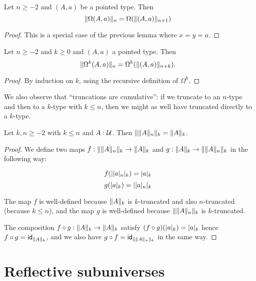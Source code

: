 \begin{cor}
  Let $n\ge-2$ and $(A,a)$ be a pointed type. Then
  \[\trunc n{\Omega(A,a)}=\Omega(\trunc{n+1}{(A,a)})\]
\end{cor}
\begin{proof}
  This is a special case of the previous lemma where $x=y=a$.
\end{proof}

\begin{cor}
  Let $n\ge -2$ and $k\ge 0$ and $(A,a)$ a pointed type.  Then
  \[\trunc n{\Omega^k(A,a)} = \Omega^k(\trunc{n+k}{(A,a)}). \]
\end{cor}
\begin{proof}
  By induction on $k$, using the recursive definition of $\Omega^k$.
\end{proof}

We also observe that ``truncations are cumulative'': if we truncate to an $n$-type and then to a $k$-type with $k\le n$, then we might as
well have truncated directly to a $k$-type.

\begin{lem}
  Let $k,n\ge-2$ with $k\le{}n$ and $A:\type$. Then
  $\trunc k{\trunc nA}=\trunc kA$.
\end{lem}
\begin{proof}
  We define two maps $f:\trunc k{\trunc nA}\to\trunc kA$ and
  $g:\trunc kA\to\trunc k{\trunc nA}$ in the following way:

  \[f(\tproj k{\tproj na})=\tproj ka\]
  \[g(\tproj ka)=\tproj k{\tproj na}\]

  The map $f$ is well-defined because $\trunc kA$ is $k$-truncated and also
  $n$-truncated (because $k\le{}n$), and the map $g$ is well-defined because
  $\trunc k{\trunc nA}$ is $k$-truncated.

  The composition $f\circ{}g:\trunc kA\to\trunc kA$ satisfy
  $(f\circ{}g)(\tproj ka)=\tproj ka$ hence $f\circ{}g=\idfunc[\trunc kA]$, and
  we also have $g\circ{}f=\idfunc[\trunc k{\trunc nA}]$ in the same way.
\end{proof}



\section{Reflective subuniverses}
\label{subsec:reflective-subuniverses}

